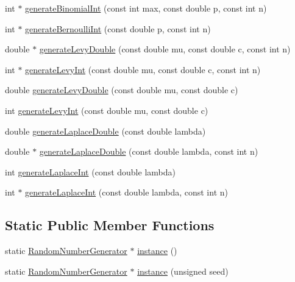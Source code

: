 \begin{DoxyCompactItemize}
\item 
int $\ast$ \hyperlink{class_random_number_generator_a5b95ab4b064f39c8bdbb14af938efc0e}{generate\+Binomial\+Int} (const int max, const double p, const int n)
\item 
int $\ast$ \hyperlink{class_random_number_generator_a2b52648a0de3e6da4c51a0f9b30a67f0}{generate\+Bernoulli\+Int} (const double p, const int n)
\item 
double $\ast$ \hyperlink{class_random_number_generator_ab107436477de3450ae40018e5b7a21a8}{generate\+Levy\+Double} (const double mu, const double c, const int n)
\item 
int $\ast$ \hyperlink{class_random_number_generator_a1eb331f894900bc5301dc7007cbedef5}{generate\+Levy\+Int} (const double mu, const double c, const int n)
\item 
double \hyperlink{class_random_number_generator_afb08ad8e6d05bcb096cc80d77225f4c5}{generate\+Levy\+Double} (const double mu, const double c)
\item 
int \hyperlink{class_random_number_generator_a2388c3148c1785ddba99269b730ec948}{generate\+Levy\+Int} (const double mu, const double c)
\item 
double \hyperlink{class_random_number_generator_a32b792dc1cc4beb79720741ae658e53f}{generate\+Laplace\+Double} (const double lambda)
\item 
double $\ast$ \hyperlink{class_random_number_generator_af10f48bbb1581a04bcc2c5aadf001440}{generate\+Laplace\+Double} (const double lambda, const int n)
\item 
int \hyperlink{class_random_number_generator_a1af6ee63a805bab7a72578652e0566fd}{generate\+Laplace\+Int} (const double lambda)
\item 
int $\ast$ \hyperlink{class_random_number_generator_a8d1b541a75590981533640bbc69da048}{generate\+Laplace\+Int} (const double lambda, const int n)
\end{DoxyCompactItemize}
\subsection*{Static Public Member Functions}
\begin{DoxyCompactItemize}
\item 
static \hyperlink{class_random_number_generator}{Random\+Number\+Generator} $\ast$ \hyperlink{class_random_number_generator_ab20e4f6dae4e1d216357d26675488e45}{instance} ()
\item 
static \hyperlink{class_random_number_generator}{Random\+Number\+Generator} $\ast$ \hyperlink{class_random_number_generator_acb83c75147d9d2bff7b3e3f45239ecb1}{instance} (unsigned seed)
\end{DoxyCompactItemize}
